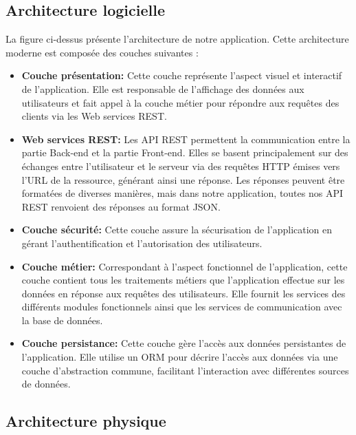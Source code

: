 \subsection{Architecture logicielle}
La figure ci-dessus présente l'architecture de notre application. Cette architecture moderne est composée des couches suivantes :
\begin{itemize}



 \item \textbf{Couche présentation:} Cette couche représente l'aspect visuel et interactif de l'application. Elle est responsable de l'affichage des données aux utilisateurs et fait appel à la couche métier pour répondre aux requêtes des clients via les Web services REST.

 \item \textbf{Web services REST:} Les API REST permettent la communication entre la partie Back-end et la partie Front-end. Elles se basent principalement sur des échanges entre l'utilisateur et le serveur via des requêtes HTTP émises vers l'URL de la ressource, générant ainsi une réponse. Les réponses peuvent être formatées de diverses manières, mais dans notre application, toutes nos API REST renvoient des réponses au format JSON.

 \item \textbf{Couche sécurité:} Cette couche assure la sécurisation de l'application en gérant l'authentification et l'autorisation des utilisateurs.

 \item \textbf{Couche métier:} Correspondant à l'aspect fonctionnel de l'application, cette couche contient tous les traitements métiers que l'application effectue sur les données en réponse aux requêtes des utilisateurs. Elle fournit les services des différents modules fonctionnels ainsi que les services de communication avec la base de données.

 \item \textbf{Couche persistance:} Cette couche gère l'accès aux données persistantes de l'application. Elle utilise un ORM pour décrire l'accès aux données via une couche d'abstraction commune, facilitant l'interaction avec différentes sources de données.
\end{itemize}

\subsection{Architecture physique}

